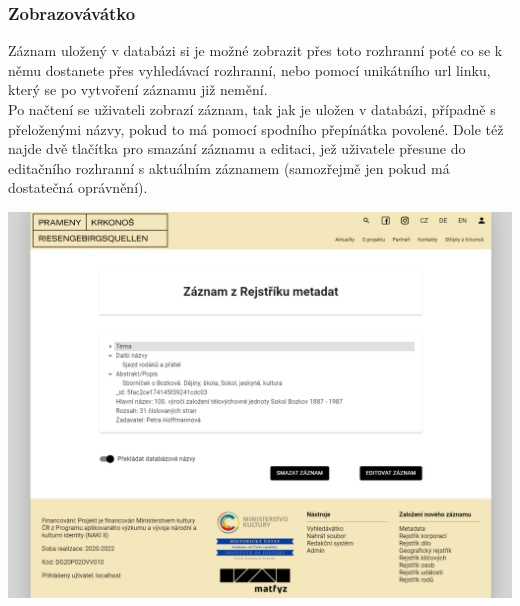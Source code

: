 \subsubsection{Zobrazovávátko}
Záznam uložený v databázi si je možné zobrazit přes toto rozhranní poté co
se k němu dostanete přes vyhledávací rozhranní, nebo pomocí unikátního
url linku, který se po vytvoření záznamu již nemění.\\
Po načtení se uživateli zobrazí záznam, tak jak je uložen v databázi, případně
s přeloženými názvy, pokud to má pomocí spodního přepínátka povolené.
Dole též najde dvě tlačítka pro smazání záznamu a editaci, jež uživatele
přesune do editačního rozhranní s aktuálním záznamem (samozřejmě jen pokud 
má dostatečná oprávnění).
\begin{center}
	\includegraphics[width=.8\textwidth]{img/showScene.png}
\end{center}

